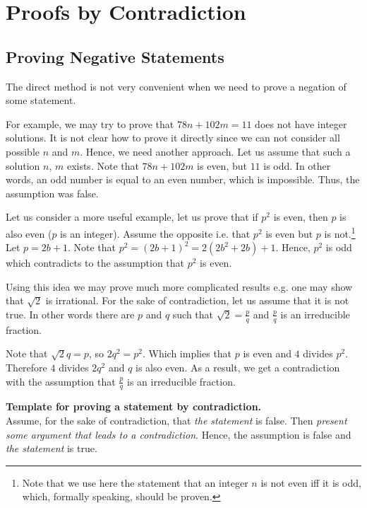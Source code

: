 \chapter{Proofs by Contradiction}
\label{chapter:indirect-proofs}
\section{Proving Negative Statements}
The direct method is not very convenient when we need to prove a negation of
some statement.

For example, we may try to prove that $78 n + 102 m = 11$ does not have integer
solutions. It is not clear how to prove it directly since we can not consider
all possible $n$ and $m$. Hence, we need another approach. Let us assume that
such a solution $n$, $m$ exists. Note that $78 n + 102 m$ is even, but $11$ is
odd. In other words, an odd number is equal to an even number, which is impossible.
Thus, the assumption was false.

Let us consider a more useful example, let us prove that if $p^2$ is even, then
$p$ is also even ($p$ is an integer). Assume the opposite i.e. that $p^2$ is
even but $p$ is not.\footnote{%
  Note that we use here the statement that an integer $n$ is not even iff it is
  odd, which, formally speaking, should be proven.
}
Let $p = 2b + 1$. Note that $p^2 = (2b + 1)^2 = 2(2b^2 + 2b) + 1$.
Hence, $p^2$ is odd which contradicts to the assumption that $p^2$ is even.

Using this idea we may prove much more complicated results e.g. one may show
that $\sqrt{2}$ is irrational. For the sake of contradiction, let us assume
that it is not true. In other words there are $p$ and $q$ such that
$\sqrt{2} = \frac{p}{q}$ and $\frac{p}{q}$ is an irreducible fraction.

Note that $\sqrt{2} q = p$, so $2q^2 = p^2$. Which implies that $p$ is even
and $4$ divides $p^2$. Therefore $4$ divides $2q^2$ and $q$ is also even. As
a result, we get a contradiction with the assumption that $\frac{p}{q}$ is an
irreducible fraction.

\begin{template}
  \textbf{Template for proving a statement by contradiction.} \\

  Assume, for the sake of contradiction, that \emph{the statement} is false.
  Then \emph{present some argument that leads to a contradiction}. Hence, the
  assumption is false and \emph{the statement} is true.
\end{template}

